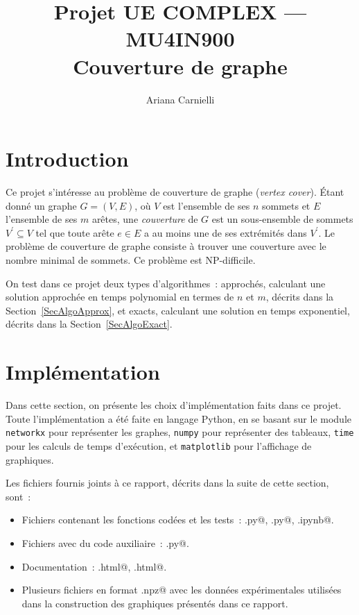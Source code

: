 \documentclass[a4paper,11pt]{amsart}
\theoremstyle{plain}
\begin{document}

\vspace*{-2.5em}

\pagestyle{plain}

\title{Projet UE COMPLEX --- MU4IN900 \\ Couverture de graphe}
\author{Ariana Carnielli}
\date{}

\maketitle

\vspace*{-2em}


\section{Introduction}

Ce projet s'intéresse au problème de couverture de graphe (\emph{vertex cover}). Étant donné un graphe $G = (V, E)$, où $V$ est l'ensemble de ses $n$ sommets et $E$ l'ensemble de ses $m$ arêtes, une \emph{couverture} de $G$ est un sous-ensemble de sommets $V^\prime \subseteq V$ tel que toute arête $e \in E$ a au moins une de ses extrémités dans $V^\prime$. Le problème de couverture de graphe consiste à trouver une couverture avec le nombre minimal de sommets. Ce problème est NP-difficile.

On test dans ce projet deux types d'algorithmes~: approchés, calculant une solution approchée en temps polynomial en termes de $n$ et $m$, décrits dans la Section~\ref{SecAlgoApprox}, et exacts, calculant une solution en temps exponentiel, décrits dans la Section~\ref{SecAlgoExact}.

\section{Implémentation}

Dans cette section, on présente les choix d'implémentation faits dans ce projet. Toute l'implémentation a été faite en langage Python, en se basant sur le module \texttt{networkx} pour représenter les graphes, \texttt{numpy} pour représenter des tableaux, \texttt{time} pour les calculs de temps d'exécution, et \texttt{matplotlib} pour l'affichage de graphiques.

Les fichiers fournis joints à ce rapport, décrits dans la suite de cette section, sont~:
\begin{itemize}
\item \raggedright Fichiers contenant les fonctions codées et les tests~: \verb@projet.py@, \verb@fonctionsTests.py@, \verb@Tests.ipynb@.
\item \raggedright Fichiers avec du code auxiliaire~: \verb@progressBar.py@.
\item \raggedright Documentation~: \verb@projet.html@, \verb@fonctionsTests.html@.
\item \raggedright Plusieurs fichiers en format \verb@.npz@ avec les données expérimentales utilisées dans la construction des graphiques présentés dans ce rapport.
\end{itemize}
\end{document}
